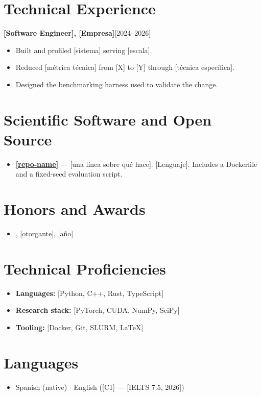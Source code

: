 \documentclass[11pt,letterpaper]{article}
\newcommand{\entry}[2]{\noindent\textbf{#1}\hfill #2\par}
\begin{document}
\section{Technical Experience}

\entry{[Software Engineer], [Empresa]}{[2024--2026]}
\begin{itemize}
  \item Built and profiled [sistema] serving [escala].
  \item Reduced [métrica técnica] from [X] to [Y] through [técnica específica].
  \item Designed the benchmarking harness used to validate the change.
\end{itemize}

\section{Scientific Software and Open Source}
\begin{itemize}
  \item \href{[url]}{\textbf{[repo-name]}} --- [una línea sobre qué hace].
        [Lenguaje]. Includes a Dockerfile and a fixed-seed evaluation script.
\end{itemize}

\section{Honors and Awards}
\begin{itemize}
  \item [Premio o beca], [otorgante], [año]
\end{itemize}

\section{Technical Proficiencies}
\begin{itemize}
  \item \textbf{Languages:} [Python, C++, Rust, TypeScript]
  \item \textbf{Research stack:} [PyTorch, CUDA, NumPy, SciPy]
  \item \textbf{Tooling:} [Docker, Git, SLURM, \LaTeX]
\end{itemize}

\section{Languages}
\begin{itemize}
  \item Spanish (native) $\cdot$ English ([C1] --- [IELTS 7.5, 2026])
\end{itemize}
\end{document}
